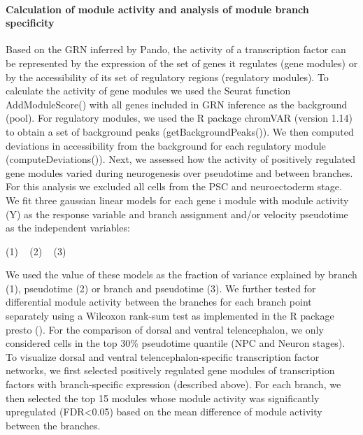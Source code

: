 \paragraph{Calculation of module activity and analysis of module branch specificity}
Based on the GRN inferred by Pando, the activity of a transcription factor can be represented by the expression of the set of genes it regulates (gene modules) or by the accessibility of its set of regulatory regions (regulatory modules). To calculate the activity of gene modules we used the Seurat function AddModuleScore() with all genes included in GRN inference as the background (pool). For regulatory modules, we used the R package chromVAR (version 1.14) to obtain a set of background peaks (getBackgroundPeaks()). We then computed deviations in accessibility from the background for each regulatory module (computeDeviations()). Next, we assessed how the activity of positively regulated gene modules varied during neurogenesis over pseudotime and between branches. For this analysis we excluded all cells from the PSC and neuroectoderm stage. We fit three gaussian linear models for each gene i module with module activity (Y) as the response variable and branch assignment and/or velocity pseudotime as the independent variables:
 
(1)   ~ 
(2)   ~ 
(3)   ~ 
 
We used the  value of these models as the fraction of variance explained by branch (1), pseudotime (2) or branch and pseudotime (3). We further tested for differential module activity between the branches for each branch point separately using a Wilcoxon rank-sum test as implemented in the R package presto (\cite{korsunsky_presto_2019}). For the comparison of dorsal and ventral telencephalon, we only considered cells in the top 30\% pseudotime quantile (NPC and Neuron stages).  To visualize dorsal and ventral telencephalon-specific transcription factor networks, we first selected positively regulated gene modules of transcription factors with branch-specific expression (described above). For each branch, we then selected the top 15 modules whose module activity was significantly upregulated (FDR<0.05) based on the mean difference of module activity between the branches.
                       
 
